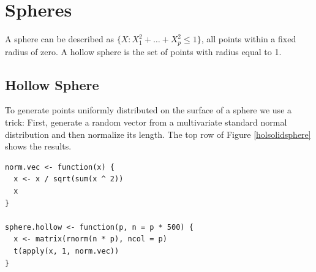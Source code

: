 \section{Spheres}

A sphere can be described as $\{X: X_1^2+\dots + X_p^2 \leq 1\}$, all
points within a fixed radius of zero.  A hollow sphere is the set of
points with radius equal to 1.

\subsection{Hollow Sphere}

To generate points uniformly distributed on the surface of a sphere we
use a trick: First, generate a random vector from a multivariate
standard normal distribution and then normalize its length. The top
row of Figure \ref{holsolidsphere} shows the results.

\begin{verbatim}
norm.vec <- function(x) {
  x <- x / sqrt(sum(x ^ 2))
  x
}

sphere.hollow <- function(p, n = p * 500) {
  x <- matrix(rnorm(n * p), ncol = p)
  t(apply(x, 1, norm.vec))
}
\end{verbatim}

